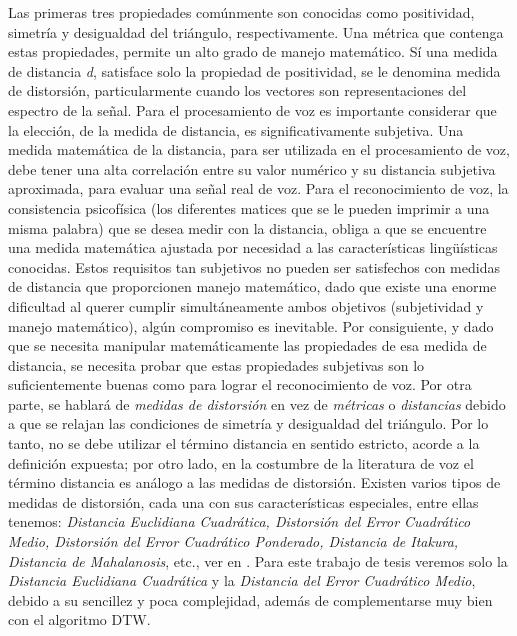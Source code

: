 \begin{enumerate}
Las primeras tres propiedades comúnmente son conocidas como positividad, simetría y desigualdad del triángulo, respectivamente. Una métrica que contenga estas propiedades, permite un alto grado de manejo matemático. Sí una medida de distancia \textit{d}, satisface solo la propiedad de positividad, se le denomina medida de distorsión, particularmente cuando los vectores son representaciones del espectro de la señal.
\vskip 0.5cm
Para el procesamiento de voz es importante considerar que la elección, de la medida de distancia, es significativamente subjetiva. Una medida matemática de la distancia, para ser utilizada en el procesamiento de voz, debe tener una alta correlación entre su valor numérico y su distancia subjetiva aproximada, para evaluar una señal real de voz. 
\vskip 0.5cm
Para el reconocimiento de voz, la consistencia psicofísica (los diferentes matices que se le pueden imprimir a una misma palabra) que se desea medir con la distancia, obliga a que se encuentre una medida matemática ajustada por necesidad a las características lingüísticas conocidas. Estos requisitos tan subjetivos no pueden ser satisfechos con medidas de distancia que proporcionen manejo matemático, dado que existe una enorme dificultad al querer cumplir simultáneamente ambos objetivos (subjetividad y manejo matemático), algún compromiso es inevitable. Por consiguiente, y dado que se necesita manipular matemáticamente las propiedades de esa medida de distancia, se necesita probar que estas propiedades subjetivas son lo suficientemente buenas como para lograr el reconocimiento de voz. 
\vskip 0.5cm
Por otra parte, se hablará de \textit{medidas de distorsión} en vez de \textit{métricas} o \textit{distancias} debido a que se relajan las condiciones de simetría y desigualdad del triángulo. Por lo tanto, no se debe utilizar el término distancia en sentido estricto, acorde a la definición expuesta; por otro lado, en la costumbre de la literatura de voz el término distancia es análogo a las medidas de distorsión.
\vskip 0.5cm
Existen varios tipos de medidas de distorsión, cada una con sus características especiales, entre ellas tenemos: \textit{Distancia Euclidiana Cuadrática, Distorsión del Error Cuadrático Medio, Distorsión del Error Cuadrático Ponderado, Distancia de Itakura, Distancia de Mahalanosis}, etc., ver en \citep{navarrete}.
\vskip 0.5cm
Para este trabajo de tesis veremos solo la \textit{Distancia Euclidiana Cuadrática} y la \textit{Distancia del Error Cuadrático Medio}, debido a su sencillez y poca complejidad, además de complementarse muy bien con el algoritmo DTW.


\end{enumerate}
